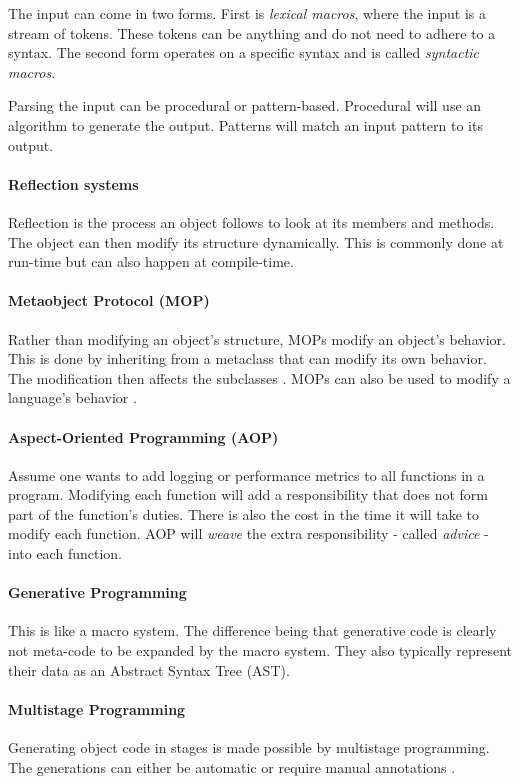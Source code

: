 The input can come in two forms.
First is \textit{lexical macros}, where the input is a stream of tokens.
These tokens can be anything and do not need to adhere to a syntax.
The second form operates on a specific syntax and is called \textit{syntactic macros}.

Parsing the input can be procedural or pattern-based.
Procedural will use an algorithm to generate the output.
Patterns will match an input pattern to its output.

\paragraph{Reflection systems}
Reflection is the process an object follows to look at its members and methods.
The object can then modify its structure dynamically.
This is commonly done at run-time but can also happen at compile-time.

\paragraph{Metaobject Protocol (MOP)}
Rather than modifying an object's structure, MOPs modify an object's behavior.
This is done by inheriting from a metaclass that can modify its own behavior.
The modification then affects the subclasses \cite{lee_95_01}.
MOPs can also be used to modify a language's behavior \cite{seaton_15_01}.

\paragraph{Aspect-Oriented Programming (AOP)}
Assume one wants to add logging or performance metrics to all functions in a program.
Modifying each function will add a responsibility that does not form part of the function's duties.
There is also the cost in the time it will take to modify each function.
AOP will \textit{weave} the extra responsibility - called \textit{advice} - into each function.

\paragraph{Generative Programming}
This is like a macro system.
The difference being that generative code is clearly not meta-code to be expanded by the macro system.
They also typically represent their data as an Abstract Syntax Tree (AST). 

\paragraph{Multistage Programming}
Generating object code in stages is made possible by multistage programming.
The generations can either be automatic or require manual annotations \cite{sheard_01_01, taha_04_01}.

